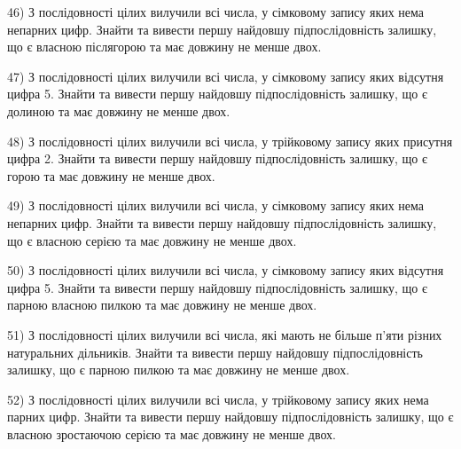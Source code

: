 \documentclass[11pt, ukrainian]{article}
\begin{document}
\par
\vspace{0.9cm}
46) \space 
З послідовності цілих вилучили всі числа, у сімковому запису яких нема непарних цифр. Знайти та вивести першу найдовшу підпослідовність залишку, що є власною післягорою та має довжину не менше двох.

\par
\vspace{0.9cm}
47) \space 
З послідовності цілих вилучили всі числа, у сімковому запису яких відсутня цифра 5. Знайти та вивести першу найдовшу підпослідовність залишку, що є долиною та має довжину не менше двох.

\par
\vspace{0.9cm}
48) \space 
З послідовності цілих вилучили всі числа, у трійковому запису яких присутня цифра 2. Знайти та вивести першу найдовшу підпослідовність залишку, що є горою та має довжину не менше двох.

\par
\vspace{0.9cm}
49) \space 
З послідовності цілих вилучили всі числа, у сімковому запису яких нема непарних цифр. Знайти та вивести першу найдовшу підпослідовність залишку, що є власною серією та має довжину не менше двох.

\par
\vspace{0.9cm}
50) \space 
З послідовності цілих вилучили всі числа, у сімковому запису яких відсутня цифра 5. Знайти та вивести першу найдовшу підпослідовність залишку, що є парною власною пилкою та має довжину не менше двох.

\par
\vspace{0.9cm}
51) \space 
З послідовності цілих вилучили всі числа, які мають не більше п'яти різних натуральних дільників. Знайти та вивести першу найдовшу підпослідовність залишку, що є парною пилкою та має довжину не менше двох.

\par
\vspace{0.9cm}
52) \space 
З послідовності цілих вилучили всі числа, у трійковому запису яких нема парних цифр. Знайти та вивести першу найдовшу підпослідовність залишку, що є власною зростаючою серією та має довжину не менше двох.
\end{document}
